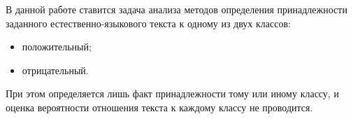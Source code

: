 В данной работе ставится задача анализа методов определения принадлежности
заданного естественно-языкового текста к одному из двух классов:
\begin{itemize}
    \item положительный;
    \item отрицательный.
\end{itemize}

При этом определяется лишь факт принадлежности тому или иному классу, и оценка
вероятности отношения текста к каждому классу не проводится.

